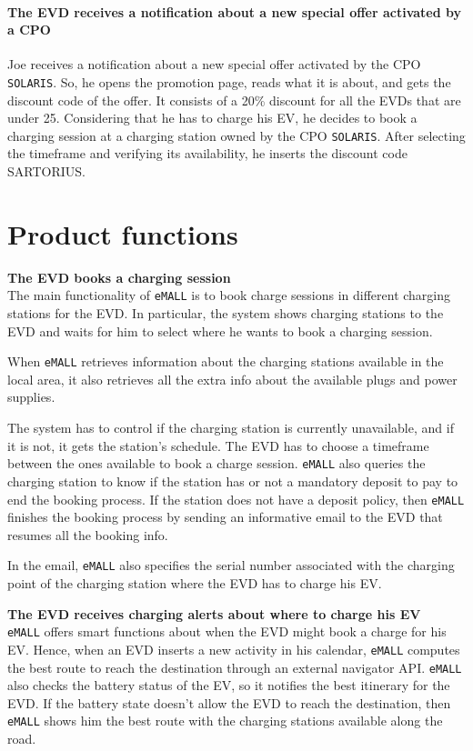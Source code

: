\paragraph{The EVD receives a notification about a new special offer activated by a CPO}
Joe receives a notification about a new special offer activated by the CPO \verb|SOLARIS|.
So, he opens the promotion page, reads what it is about, and gets the discount code of the offer.
It consists of a 20\% discount for all the EVDs that are under 25.
Considering that he has to charge his EV, he decides to book a charging session at a charging station owned by the CPO \verb|SOLARIS|.
After selecting the timeframe and verifying its availability, he inserts the discount code SARTORIUS\@.


\section{Product functions}
\label{sec:product_functions}%
\textbf{The EVD books a charging session} \\
The main functionality of \verb|eMALL| is to book charge sessions in different charging stations for the EVD\@.
In particular, the system shows charging stations to the EVD and waits for him to select where he wants to book a charging session.

When \verb|eMALL| retrieves information about the charging stations available in the local area, it also retrieves all the extra info about the available plugs and power supplies.

The system has to control if the charging station is currently unavailable, and if it is not, it gets the station's schedule.
The EVD has to choose a timeframe between the ones available to book a charge session.
\verb|eMALL| also queries the charging station to know if the station has or not a mandatory deposit to pay to end the booking process.
If the station does not have a deposit policy, then \verb|eMALL| finishes the booking process by sending an informative email to the EVD that resumes all the booking info.

In the email, \verb|eMALL| also specifies the serial number associated with the charging point of the charging station where the EVD has to charge his EV\@.

\textbf{The EVD receives charging alerts about where to charge his EV} \\
\verb|eMALL| offers smart functions about when the EVD might book a charge for his EV\@.
Hence, when an EVD inserts a new activity in his calendar, \verb|eMALL| computes the best route to reach the destination through an external navigator API\@.
\verb|eMALL| also checks the battery status of the EV, so it notifies the best itinerary for the EVD\@.
If the battery state doesn't allow the EVD to reach the destination, then \verb|eMALL| shows him the best route with the charging stations available along the road.

